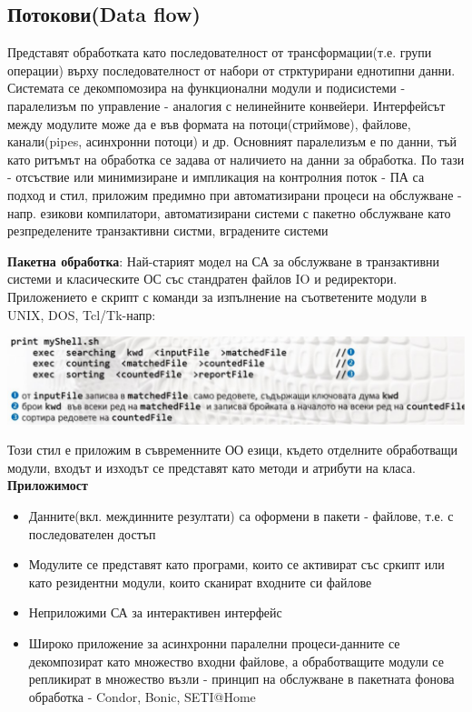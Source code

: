 \documentclass[11pt]{article} %
\begin{document}
\subsection{Потокови(Data flow)}
Представят обработката като последователност от трансформации(т.е. групи операции) върху последователност от набори от стрктурирани еднотипни данни. Системата се декомпомозира на функционални модули и подисистеми - паралелизъм по управление - аналогия с нелинейните конвейери. Интерфейсът между модулите може да е във формата на потоци(стриймове), файлове, канали(pipes, асинхронни потоци) и др. Основният паралелизъм е по данни, тъй като ритъмът на обработка се задава от наличието на данни за обработка. По тази - отсъствие или минимизиране и импликация на контролния поток - ПА са подход и стил, приложим предимно при автоматизирани процеси на обслужване - напр. езикови компилатори, автоматизирани системи с пакетно обслужване като резпределените транзактивни систми, вградените системи\\\par
\textbf{Пакетна обработка}: Най-старият модел на СА за обслужване в транзактивни системи и класическите ОС със стандратен файлов IO и редиректори. Приложението е скрипт с команди за изпълнение на съответените модули в UNIX, DOS, Tcl/Tk-напр:
\begin{center}
	\includegraphics[scale=0.5]{PackageProcessing.png}
\end{center}
Този стил е приложим в съвременните ОО езици, където отделните обработващи модули, входът и изходът се представят като методи и атрибути на класа.\\
\textbf{Приложимост}
\begin{itemize}[noitemsep]
	\item Данните(вкл. междинните резултати) са оформени в пакети - файлове, т.е. с последователен достъп
	\item Модулите се представят като програми, които се активират със сркипт или като резидентни модули, които сканират входните си файлове
	\item Неприложими СА за интерактивен интерфейс
	\item Широко приложение за асинхронни паралелни процеси-данните се декомпозират като множество входни файлове, а обработващите модули се репликират в множество възли - принцип на обслужване в пакетната фонова обработка - Condor, Bonic, SETI@Home \\\par
\end{itemize}
\end{document}
